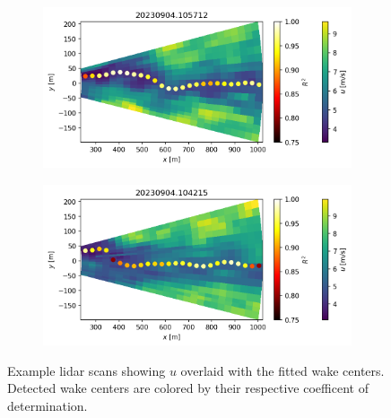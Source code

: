 \documentclass[%
 aip,
 amsmath,
 amssymb,
preprint,%
]{revtex4-2}
\begin{document}
\begin{figure}[htbp]
  \centering
  \begin{subfigure}[b]{0.48\columnwidth}
    \includegraphics[width=\columnwidth]{figs/lidarScan_-70_wakeCenters_20240925.png}
  \end{subfigure}
  \begin{subfigure}[b]{0.48\columnwidth}
    \includegraphics[width=\columnwidth]{figs/lidarScan_700_wakeCenters_20240925.png}
  \end{subfigure}
  \caption{Example lidar scans showing $u$ overlaid with the fitted wake centers. Detected wake centers are colored by their respective coefficent of determination.}
  \label{fig:lidarScanCenters}
\end{figure}
\end{document}
